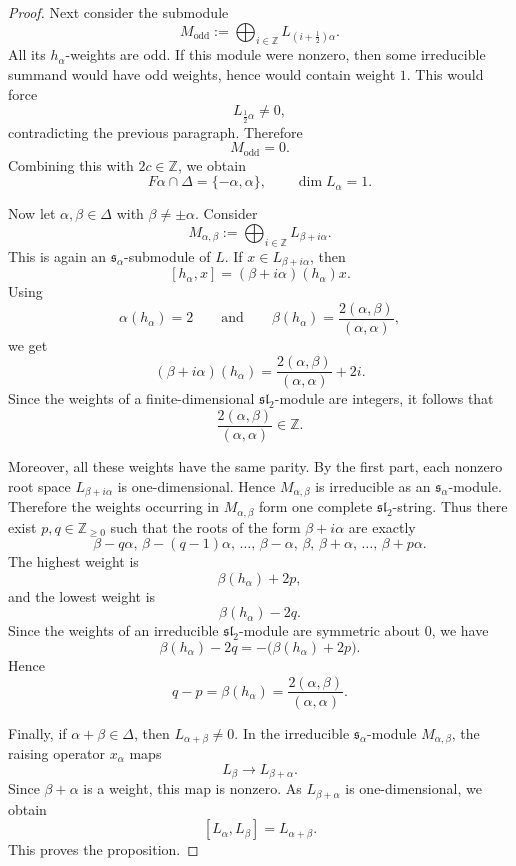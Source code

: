 \begin{proof}
    Next consider the submodule
    \[
        M_{\mathrm{odd}}
        :=
        \bigoplus_{i\in\mathbb{Z}} L_{\left(i+\frac12\right)\alpha}.
    \]
    All its \(h_\alpha\)-weights are odd. If this module were nonzero, then some
    irreducible summand would have odd weights, hence would contain weight \(1\).
    This would force
    \[
        L_{\frac12\alpha}\neq 0,
    \]
    contradicting the previous paragraph. Therefore
    \[
        M_{\mathrm{odd}}=0.
    \]
    Combining this with \(2c\in\mathbb{Z}\), we obtain
    \[
        F\alpha\cap\Delta=\{-\alpha,\alpha\},
        \qquad
        \dim L_\alpha=1.
    \]

    Now let \(\alpha,\beta\in\Delta\) with \(\beta\neq \pm\alpha\). Consider
    \[
        M_{\alpha,\beta}
        :=
        \bigoplus_{i\in\mathbb{Z}} L_{\beta+i\alpha}.
    \]
    This is again an \(\mathfrak{s}_\alpha\)-submodule of \(L\). If
    \(x\in L_{\beta+i\alpha}\), then
    \[
        [h_\alpha,x]
        =
        (\beta+i\alpha)(h_\alpha)x.
    \]
    Using
    \[
        \alpha(h_\alpha)=2
        \qquad\text{and}\qquad
        \beta(h_\alpha)=\frac{2(\alpha,\beta)}{(\alpha,\alpha)},
    \]
    we get
    \[
        (\beta+i\alpha)(h_\alpha)
        =
        \frac{2(\alpha,\beta)}{(\alpha,\alpha)}+2i.
    \]
    Since the weights of a finite-dimensional \(\mathfrak{sl}_2\)-module are
    integers, it follows that
    \[
        \frac{2(\alpha,\beta)}{(\alpha,\alpha)}\in\mathbb{Z}.
    \]

    Moreover, all these weights have the same parity. By the first part, each
    nonzero root space \(L_{\beta+i\alpha}\) is one-dimensional. Hence
    \(M_{\alpha,\beta}\) is irreducible as an \(\mathfrak{s}_\alpha\)-module.
    Therefore the weights occurring in \(M_{\alpha,\beta}\) form one complete
    \(\mathfrak{sl}_2\)-string. Thus there exist \(p,q\in\mathbb{Z}_{\geq 0}\)
    such that the roots of the form \(\beta+i\alpha\) are exactly
    \[
        \beta-q\alpha,\,
        \beta-(q-1)\alpha,\,
        \ldots,\,
        \beta-\alpha,\,
        \beta,\,
        \beta+\alpha,\,
        \ldots,\,
        \beta+p\alpha.
    \]
    The highest weight is
    \[
        \beta(h_\alpha)+2p,
    \]
    and the lowest weight is
    \[
        \beta(h_\alpha)-2q.
    \]
    Since the weights of an irreducible \(\mathfrak{sl}_2\)-module are symmetric
    about \(0\), we have
    \[
        \beta(h_\alpha)-2q
        =
        -\bigl(\beta(h_\alpha)+2p\bigr).
    \]
    Hence
    \[
        q-p
        =
        \beta(h_\alpha)
        =
        \frac{2(\alpha,\beta)}{(\alpha,\alpha)}.
    \]

    Finally, if \(\alpha+\beta\in\Delta\), then \(L_{\alpha+\beta}\neq 0\).
    In the irreducible \(\mathfrak{s}_\alpha\)-module \(M_{\alpha,\beta}\), the
    raising operator \(x_\alpha\) maps
    \[
        L_\beta
        \longrightarrow
        L_{\beta+\alpha}.
    \]
    Since \(\beta+\alpha\) is a weight, this map is nonzero. As
    \(L_{\beta+\alpha}\) is one-dimensional, we obtain
    \[
        [L_\alpha,L_\beta]
        =
        L_{\alpha+\beta}.
    \]
    This proves the proposition.
\end{proof}

